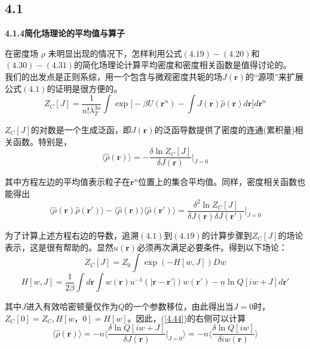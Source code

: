 \subsection{4.1}
\textbf{4.1.4简化场理论的平均值与算子}

在密度场 $\rho $ 未明显出现的情况下，怎样利用公式$(4.19)-(4.20)$和$(4.30)-(4.31)$的简化场理论计算平均密度和密度相关函数是值得讨论的。\\

我们的出发点是正则系综，用一个包含与微观密度共轭的场$J(\mathbf{r})$的“源项”来扩展公式$(4.1)$的证明是很方便的。\\
\begin{equation}
Z_{C}[J]=\frac{1}{n! \lambda _{T}^{3n}} \int  \exp \bigg[-\beta U(\mathbf{r}^{n})- \int J(\mathbf{r}) \hat{ \rho }(\mathbf{r})d\mathbf{r} \bigg] d \mathbf{r}^{n}
\end{equation}

$Z_{C}[J]$的对数是一个生成泛函，即$J(\mathbf{r})$的泛函导数提供了密度的连通(累积量)相关函数。特别是，\\
\begin{equation}
\langle \hat{ \rho } (\mathbf{r}) \rangle = - \frac{\delta \ln Z_{C}[J] }{\delta J(\mathbf{r})} \bigg |_{J=0}
\end{equation}

其中方程左边的平均值表示粒子在$\mathbf{r}^{n}$位置上的集合平均值。同样，密度相关函数也能得出\\
\begin{equation}
\langle \hat{ \rho } (\mathbf{r}) \hat{ \rho } (\mathbf{r'})\rangle - \langle  \hat{ \rho } (\mathbf{r}) \rangle \langle  \hat{ \rho } (\mathbf{r'}) \rangle = \frac{\delta ^{2} \ln Z_{C}[J]}{\delta J(\mathbf{r}) \delta J(\mathbf{r'})} \bigg |_{J=0}
\label{4.44}
\end{equation}

为了计算上述方程右边的导数，追溯$(4.1)$到$(4.19)$的计算步骤到$Z_{C}[J]$的场论表示，这是很有帮助的。显然$u(\mathbf{r})$必须再次满足必要条件。得到以下场论：\\
\begin{equation}
Z_{C}[J]=Z_{0} \int \exp (-H[w,J]) D w 
\end{equation}
\begin{equation}
H[w ,J]=\frac{1}{2 \beta } \int d\mathbf{\mathbf{r}} \int w (\mathbf{r}) u^{-1} (|\mathbf{r-r'}|) w (\mathbf{r'}) - n \ln Q[i w +J] d\mathbf{r'}
\end{equation}

其中$J$进入有效哈密顿量仅作为$Q$的一个参数移位，由此得出当$J=0$时，$Z_{C}[0]=Z_{C},H[ w，0]=H[ w ]$。因此，(\ref{4.44})的右侧可以计算\\
\begin{equation}
\langle \hat{ \rho } (\mathbf{r}) \rangle = - n \langle \frac{ \delta \ln Q[i w + J ]}{ \delta J(\mathbf{r}) } \bigg|_{J=0} \rangle = -n \langle \frac{\delta \ln Q[ i w]}{ \delta i w (\mathbf{r})} \rangle
\label{4.48}
\end{equation}

